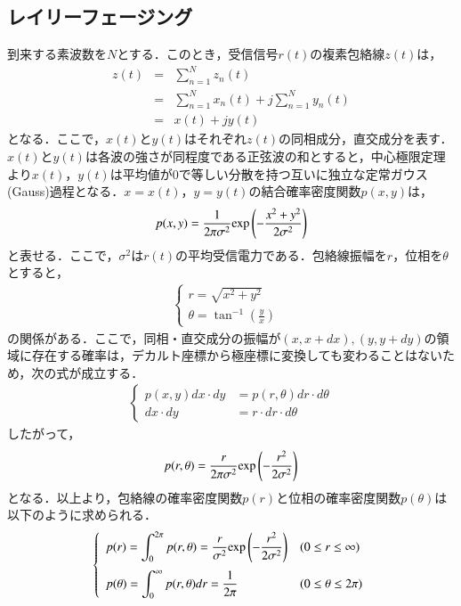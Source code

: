 \subsection{レイリーフェージング}
到来する素波数を$N$とする．このとき，受信信号$r(t)$の複素包絡線$z(t)$は，
\begin{eqnarray}
z(t)&=&\sum_{n=1}^{N}z_{n}(t)　\nonumber　\\
&=&\sum_{n=1}^{N}x_n(t)+j\sum_{n=1}^{N}y_n(t) \nonumber \\
&=& x(t)+j y(t)
\end{eqnarray}
となる．ここで，$x(t)$と$y(t)$はそれぞれ$z(t)$の同相成分，直交成分を表す．$x(t)$と$y(t)$は各波の強さが同程度である正弦波の和とすると，中心極限定理より$x(t)$，$y(t)$は平均値が0で等しい分散を持つ互いに独立な定常ガウス(Gauss)過程となる．$x=x(t)$，$y=y(t)$の結合確率密度関数$p(x,y)$は，
\begin{eqnarray}
p(x,y)=\frac{1}{2\pi \sigma^2}{\rm exp}\left(-\frac{x^2+y^2}{2\sigma^2}\right)
\end{eqnarray}
と表せる．ここで，$\sigma^2$は$r(t)$の平均受信電力である．包絡線振幅を$r$，位相を$\theta$とすると，
\begin{eqnarray}
\begin{cases}
r=\sqrt{x^2+y^2}& \\[4pt]
\theta=\tan^{-1}\left(\displaystyle \frac{y}{x}\right)&
\end{cases}
\end{eqnarray}
の関係がある．ここで，同相・直交成分の振幅が$(x, x+dx), (y, y+dy)$の領域に存在する確率は，デカルト座標から極座標に変換しても変わることはないため，次の式が成立する．
\begin{eqnarray}
\left\{
\begin{array}{ll}
p(x,y)dx\cdot dy & =p(r,\theta)dr\cdot d\theta  \\[12pt]
dx\cdot dy & =r\cdot dr\cdot d\theta
\end{array}
\right.
\end{eqnarray}
したがって，
\begin{eqnarray}
p(r,\theta)=\frac{r}{2\pi \sigma^2}{\rm exp}\left(-\frac{r^2}{2\sigma^2}\right)
\end{eqnarray}
となる．以上より，包絡線の確率密度関数$p(r)$と位相の確率密度関数$p(\theta)$は以下のように求められる．
\begin{eqnarray}
\left\{
\begin{array}{ll}
p(r)=\displaystyle \int_0^{2\pi}p(r,\theta)=\frac{r}{\sigma^2}{\rm exp}\left(-\frac{r^2}{2\sigma^2}\right)&(0\leq r \leq \infty)\\[12pt]
p(\theta)=\displaystyle \int_0^\infty p(r,\theta)dr=\frac{1}{2\pi} & (0\leq\theta\leq2\pi)
\end{array}
\right.
\end{eqnarray}
